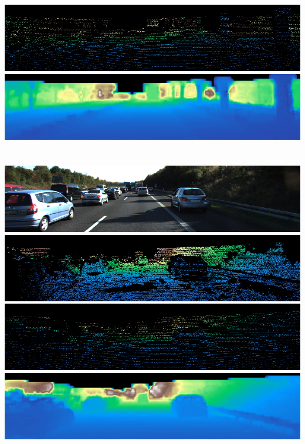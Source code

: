 \includegraphics[width=\textwidth]{visual_results/input2}\\
\includegraphics[width=\textwidth]{visual_results/prediction2}\\\\\\
\includegraphics[width=\textwidth]{visual_results/rgb3}\\
\includegraphics[width=\textwidth]{visual_results/ground3}\\
\includegraphics[width=\textwidth]{visual_results/input3}\\
\includegraphics[width=\textwidth]{visual_results/prediction3}
